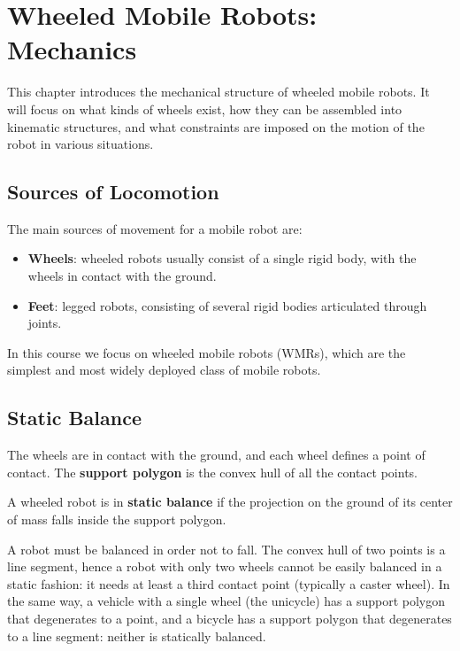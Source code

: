 \chapter{Wheeled Mobile Robots: Mechanics}
\label{ch:wmr-mechanics}

This chapter introduces the mechanical structure of wheeled mobile
robots. It will focus on what kinds of wheels exist, how they
can be assembled into kinematic structures, and what constraints are imposed on the motion of the robot
in various situations.

\section{Sources of Locomotion}
\label{sec:locomotion}

The main sources of movement for a mobile robot are:
\begin{itemize}
    \item \textbf{Wheels}: wheeled robots usually consist of a single
          rigid body, with the wheels in contact with the ground.
    \item \textbf{Feet}: legged robots, consisting of several rigid
          bodies articulated through joints.
\end{itemize}

In this course we focus on wheeled mobile robots (WMRs), which are the
simplest and most widely deployed class of mobile robots.

\section{Static Balance}
\label{sec:static-balance}

The wheels are in contact with the ground, and each wheel defines a
point of contact. The \textbf{support polygon} is the convex hull of
all the contact points.

\begin{definition}
A wheeled robot is in \textbf{static balance} if the projection on the
ground of its center of mass falls inside the support polygon.
\end{definition}

A robot must be balanced in order not to fall. The convex hull of two
points is a line segment, hence a robot with only two wheels cannot be
easily balanced in a static fashion: it needs at least a third contact
point (typically a caster wheel). In the same way, a vehicle with a
single wheel (the unicycle) has a support polygon that degenerates to a
point, and a bicycle has a support polygon that degenerates to a line
segment: neither is statically balanced.

